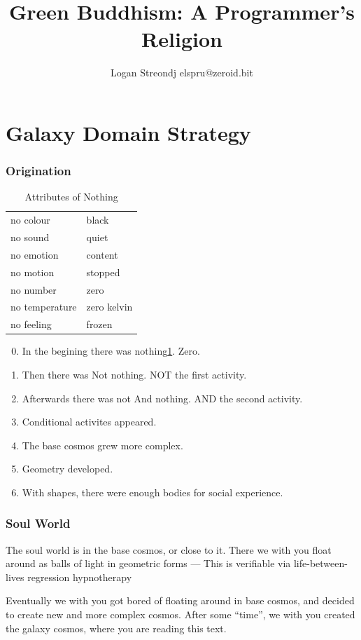 \documentclass{report}
\title{Green Buddhism: A Programmer's Religion}
\author{Logan Streondj elspru@zeroid.bit}
\begin{document}
\part{Galaxy Domain Strategy}

\section{Origination}
\label{origination}
\begin{table}
\begin{tabular}{l l} 
  no colour & black \\
  no sound & quiet \\
  no emotion & content \\
  no motion & stopped \\
  no number & zero \\
  no temperature & zero kelvin \\
  no feeling & frozen \\
\end{tabular}
\caption{Attributes of Nothing}
\label{nothing}
\end{table}
\begin{enumerate}
\setcounter{enumi}{-1}
\item In the begining there was nothing\ref{nothing}. Zero.
\item Then there was Not nothing. NOT the first activity. 
\item Afterwards there was not And nothing. AND the second activity.
\item Conditional activites appeared. 
\item The base cosmos grew more complex. 
\item Geometry developed. 
\item With shapes, there were enough bodies for social experience.
\end{enumerate}

\section{Soul World}
\label{soulWorld}

The soul world is in the base cosmos, or close to it.
There we with you float around as balls of light in geometric forms ---
This is verifiable via life-between-lives regression
hypnotherapy\cite{newtins}\cite{newton2000destiny}

Eventually we with you got bored of floating around in base cosmos,
and decided to create new and more complex cosmos.
After some ``time'', we with you created the galaxy cosmos, where you are reading this
text.
\end{document}
